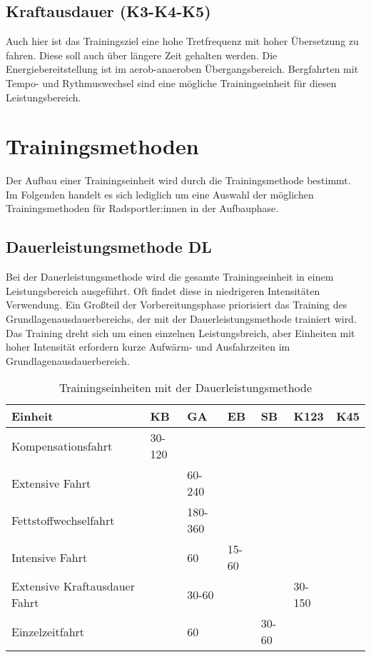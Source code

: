 \subsection{Kraftausdauer (K3-K4-K5)}
Auch hier ist das Trainingsziel eine hohe Tretfrequenz mit hoher Übersetzung zu fahren. Diese soll auch über längere Zeit gehalten werden. Die Energiebereitstellung ist im aerob-anaeroben Übergangsbereich. Bergfahrten mit Tempo- und Rythmuswechsel sind eine mögliche Trainingseinheit für diesen Leistungsbereich.

\section{Trainingsmethoden}
\label{grundlagen:methoden}

Der Aufbau einer Trainingseinheit wird durch die Trainingsmethode bestimmt. Im Folgenden handelt es sich lediglich um eine Auswahl der möglichen Trainingsmethoden für Radsportler:innen in der Aufbauphase.\cite[40-43]{Radsporttraining}
\subsection{Dauerleistungsmethode DL}
Bei der Dauerleistungsmethode wird die gesamte Trainingseinheit in einem Leistungsbereich ausgeführt. Oft findet diese in niedrigeren Intensitäten Verwendung. Ein Großteil der Vorbereitungsphase priorisiert das Training des Grundlagenausdauerbereichs, der mit der Dauerleistungsmethode trainiert wird.
Das Training dreht sich um einen einzelnen Leistungsbreich, aber Einheiten mit hoher Intensität erfordern kurze Aufwärm- und Ausfahrzeiten im Grundlagenausdauerbereich.
\begin{table}[h]
\centering  
    \begin{tabularx}{\textwidth}{|b|ssssss|}
    \hline
    \textbf{Einheit} & \textbf{KB} & \textbf{GA}& \textbf{EB}& \textbf{SB}& \textbf{K123}   &\textbf{K45} \\  \hline
    Kompensationsfahrt                  & 30-120 &         &             &        &        &           \\ \hline
    Extensive Fahrt                     &        & 60-240  &             &        &        &           \\ \hline
    Fettstoffwechselfahrt               &        & 180-360 &             &        &        &           \\ \hline
    Intensive Fahrt                     &        & 60      & 15-60       &        &        &           \\ \hline
    Extensive Kraftausdauer Fahrt       &        & 30-60   &             &        & 30-150 &           \\ \hline
    Einzelzeitfahrt                     &        & 60      &             & 30-60  &        &           \\ \hline
    \end{tabularx}
    \caption{Trainingseinheiten mit der Dauerleistungsmethode}
    \label{table:fahrtspiel}
\end{table}
